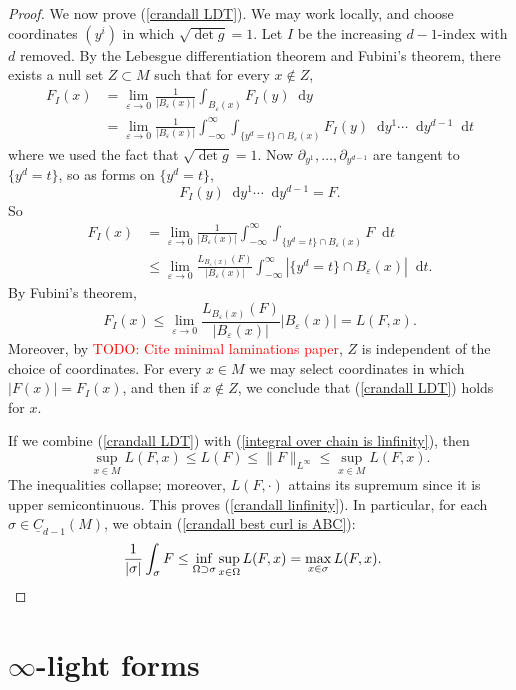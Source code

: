 \documentclass[reqno,11pt]{amsart}
\newcommand*\dif{\mathop{}\!\mathrm{d}}
\newcommand{\Chain}{\underline C}
\theoremstyle{definition}
\numberwithin{equation}{section}
\newcommand\todo[1]{\textcolor{red}{TODO: #1}}
\begin{document}
\begin{proof}
We now prove (\ref{crandall LDT}).
We may work locally, and choose coordinates $(y^i)$ in which $\sqrt{\det g} = 1$.
Let $I$ be the increasing $d-1$-index with $d$ removed.
By the Lebesgue differentiation theorem and Fubini's theorem, there exists a null set $Z \subset M$ such that for every $x \notin Z$,
\begin{align*}
F_I(x) 
&= \lim_{\varepsilon \to 0} \frac{1}{|B_\varepsilon(x)|} \int_{B_\varepsilon(x)} F_I(y) \dif y \\
&= \lim_{\varepsilon \to 0} \frac{1}{|B_\varepsilon(x)|} \int_{-\infty}^\infty \int_{\{y^d = t\} \cap B_\varepsilon(x)} F_I(y) \dif y^1 \cdots \dif y^{d - 1} \dif t
\end{align*}
where we used the fact that $\sqrt{\det g} = 1$.
Now $\partial_{y^1}, \dots, \partial_{y^{d - 1}}$ are tangent to $\{y^d = t\}$, so as forms on $\{y^d = t\}$,
$$F_I(y) \dif y^1 \cdots \dif y^{d - 1} = F.$$
So
\begin{align*}
F_I(x) 
&= \lim_{\varepsilon \to 0} \frac{1}{|B_\varepsilon(x)|} \int_{-\infty}^\infty \int_{\{y^d = t\} \cap B_\varepsilon(x)} F \dif t \\
&\leq \lim_{\varepsilon \to 0} \frac{L_{B_\varepsilon(x)}(F)}{|B_\varepsilon(x)|} \int_{-\infty}^\infty |\{y^d = t\} \cap B_\varepsilon(x)| \dif t.
\end{align*}
By Fubini's theorem,
$$F_I(x) \leq \lim_{\varepsilon \to 0} \frac{L_{B_\varepsilon(x)}(F)}{|B_\varepsilon(x)|} |B_\varepsilon(x)| = L(F, x).$$
Moreover, by \todo{Cite minimal laminations paper}, $Z$ is independent of the choice of coordinates.
For every $x \in M$ we may select coordinates in which $|F(x)| = F_I(x)$, and then if $x \notin Z$, we conclude that (\ref{crandall LDT}) holds for $x$.

If we combine (\ref{crandall LDT}) with (\ref{integral over chain is linfinity}), then
$$\sup_{x \in M} L(F, x) \leq L(F) \leq \|F\|_{L^\infty} \leq \sup_{x \in M} L(F, x).$$
The inequalities collapse; moreover, $L(F, \cdot)$ attains its supremum since it is upper semicontinuous.
This proves (\ref{crandall linfinity}).
In particular, for each $\sigma \in \Chain_{d - 1}(M)$, we obtain (\ref{crandall best curl is ABC}):
\begin{align*}
\frac{1}{|\sigma|} \int_\sigma F &\leq \inf_{\Omega \supset \sigma} \sup_{x \in \Omega} L(F, x) = \max_{x \in \sigma} L(F, x). \qedhere
\end{align*}
\end{proof}


\section{\texorpdfstring{$\infty$-light forms}{Infinity-light forms}}
\end{document}
